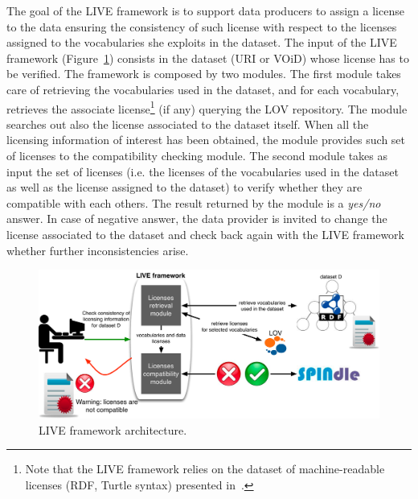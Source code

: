 The goal of the LIVE framework is to support data producers to assign a license to the data ensuring the consistency of such license with respect to the licenses assigned to the vocabularies she exploits in the dataset. The input of the LIVE framework (Figure~\ref{fig:framework}) consists in the dataset (URI or VOiD) whose license has to be verified. The framework is composed by two modules. The first module takes care of retrieving the vocabularies used in the dataset, and for each vocabulary, retrieves the associate license\footnote{Note that the LIVE framework relies on the dataset of machine-readable licenses (RDF, Turtle syntax) presented in~\cite{CabrioESWC2014}.} (if any) querying the LOV repository. The module searches out also the license associated to the dataset itself. When all the licensing information of interest has been obtained, the module provides such set of licenses to the compatibility checking module.
The second module takes as input the set of licenses (i.e. the licenses of the vocabularies used in the dataset as well as the license assigned to the dataset) to verify whether they are compatible with each others. The result returned by the module is a \textit{yes/no} answer. In case of negative answer, the data provider is invited to change the license associated to the dataset and check back again with the LIVE framework whether further inconsistencies arise.

\begin{figure}
\centering
\includegraphics[width=12.0cm]{img/live-framework.pdf}
\caption{LIVE framework architecture.}
\label{fig:framework}
\end{figure}

